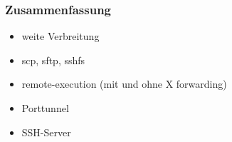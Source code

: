 \begin{frame}
\frametitle{Zusammenfassung}
\begin{itemize}
\item weite Verbreitung
\item scp, sftp, sshfs
\item remote-execution (mit und ohne X forwarding)
\item Porttunnel
\item SSH-Server
\end{itemize}
\end{frame}